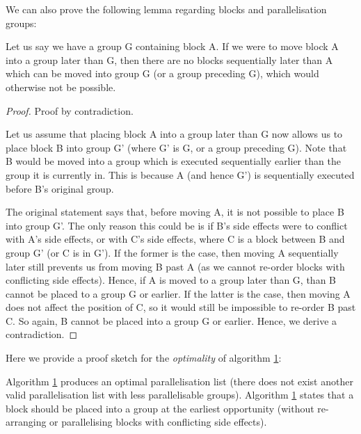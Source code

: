 We can also prove the following lemma regarding blocks and parallelisation groups:

\begin{lemma}
  Let us say we have a group G containing block A. If we were to move block A into a group later than G, then there are no blocks sequentially later than A which can be moved into group G (or a group preceding G), which would otherwise not be possible. \label{lemma:two}
\end{lemma}

\begin{proof}
  Proof by contradiction.

  Let us assume that placing block A into a group later than G now allows us to place block B into group G' (where G' is G, or a group preceding G). Note that B would be moved into a group which is executed sequentially earlier than the group it is currently in. This is because A (and hence G') is sequentially executed before B's original group. 
  
  The original statement says that, before moving A, it is not possible to place B into group G'. The only reason this could be is if B's side effects were to conflict with A's side effects, or with C's side effects, where C is a block between B and group G' (or C is in G'). If the former is the case, then moving A sequentially later still prevents us from moving B past A (as we cannot re-order blocks with conflicting side effects). Hence, if A is moved to a group later than G, than B cannot be placed to a group G or earlier. If the latter is the case, then moving A does not affect the position of C, so it would still be impossible to re-order B past C. So again, B cannot be placed into a group G or earlier. Hence, we derive a contradiction. 
\end{proof}


\newpage 

Here we provide a proof sketch for the \textit{optimality} of algorithm \hyperref[alg:one]{1}:

\setcounter{theorem}{0}

\begin{theorem}
  Algorithm \hyperref[alg:one]{1} produces an optimal parallelisation list (there does not exist another valid parallelisation list with less parallelisable groups). Algorithm \hyperref[alg:one]{1} states that a block should be placed into a group at the earliest opportunity (without re-arranging or parallelising blocks with conflicting side effects). 
\end{theorem}

